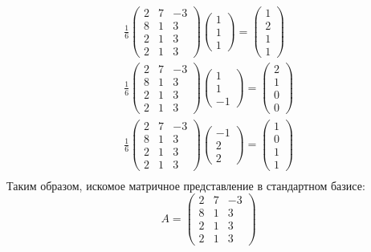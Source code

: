 \begin{gather}
    \frac16
    \begin{pmatrix}
        2 & 7 & -3 \\
        8 & 1 &  3 \\
        2 & 1 &  3 \\
        2 & 1 &  3 
    \end{pmatrix}
    \begin{pmatrix}
        1 \\ 1 \\ 1
    \end{pmatrix} = 
    \begin{pmatrix}
        1 \\ 2 \\ 1 \\ 1
    \end{pmatrix} \\
    \frac16
    \begin{pmatrix}
        2 & 7 & -3 \\
        8 & 1 &  3 \\
        2 & 1 &  3 \\
        2 & 1 &  3 
    \end{pmatrix}
    \begin{pmatrix}
        1 \\ 1 \\ -1
    \end{pmatrix} = 
    \begin{pmatrix}
        2 \\ 1 \\ 0 \\ 0
    \end{pmatrix} \\
    \frac16
    \begin{pmatrix}
        2 & 7 & -3 \\
        8 & 1 &  3 \\
        2 & 1 &  3 \\
        2 & 1 &  3 
    \end{pmatrix}
    \begin{pmatrix}
        -1 \\ 2 \\ 2
    \end{pmatrix} = 
    \begin{pmatrix}
        1 \\ 0 \\ 1 \\ 1
    \end{pmatrix} \\
\end{gather}
Таким образом, искомое матричное представление в стандартном базисе:
\begin{equation}
    A = 
    \begin{pmatrix}
        2 & 7 & -3 \\
        8 & 1 &  3 \\
        2 & 1 &  3 \\
        2 & 1 &  3 
    \end{pmatrix}
\end{equation}